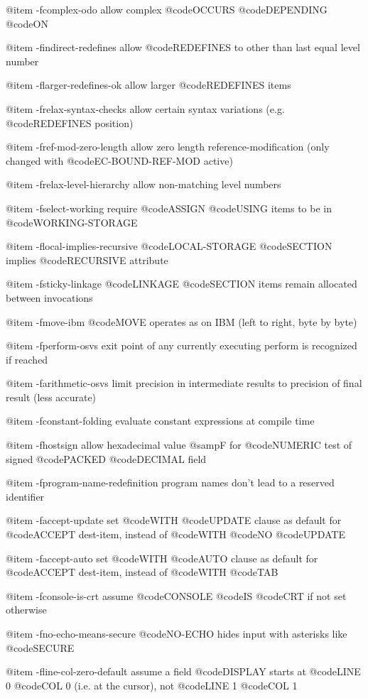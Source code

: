 @item -fcomplex-odo
allow complex @code{OCCURS} @code{DEPENDING} @code{ON}

@item -findirect-redefines
allow @code{REDEFINES} to other than last equal level number

@item -flarger-redefines-ok
allow larger @code{REDEFINES} items

@item -frelax-syntax-checks
allow certain syntax variations (e.g. @code{REDEFINES} position)

@item -fref-mod-zero-length
allow zero length reference-modification (only changed with @code{EC-BOUND-REF-MOD} active)

@item -frelax-level-hierarchy
allow non-matching level numbers

@item -fselect-working
require @code{ASSIGN} @code{USING} items to be in @code{WORKING-STORAGE}

@item -flocal-implies-recursive
@code{LOCAL-STORAGE} @code{SECTION} implies @code{RECURSIVE} attribute

@item -fsticky-linkage
@code{LINKAGE} @code{SECTION} items remain allocated between invocations

@item -fmove-ibm
@code{MOVE} operates as on IBM (left to right, byte by byte)

@item -fperform-osvs
exit point of any currently executing perform is recognized if reached

@item -farithmetic-osvs
limit precision in intermediate results to precision of final result (less accurate)

@item -fconstant-folding
evaluate constant expressions at compile time

@item -fhostsign
allow hexadecimal value @samp{F} for @code{NUMERIC} test of signed @code{PACKED} @code{DECIMAL} field

@item -fprogram-name-redefinition
program names don't lead to a reserved identifier

@item -faccept-update
set @code{WITH} @code{UPDATE} clause as default for @code{ACCEPT} dest-item, instead of @code{WITH} @code{NO} @code{UPDATE}

@item -faccept-auto
set @code{WITH} @code{AUTO} clause as default for @code{ACCEPT} dest-item, instead of @code{WITH} @code{TAB}

@item -fconsole-is-crt
assume @code{CONSOLE} @code{IS} @code{CRT} if not set otherwise

@item -fno-echo-means-secure
@code{NO-ECHO} hides input with asterisks like @code{SECURE}

@item -fline-col-zero-default
assume a field @code{DISPLAY} starts at @code{LINE 0} @code{COL 0} (i.e. at the cursor), not @code{LINE 1} @code{COL 1}

